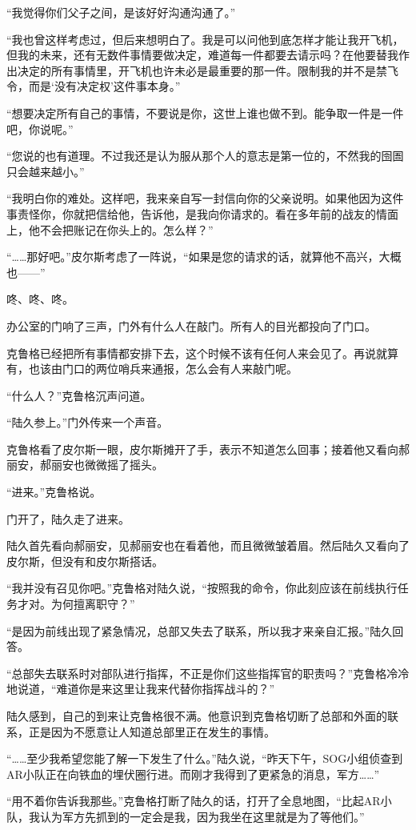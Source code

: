 “我觉得你们父子之间，是该好好沟通沟通了。”

“我也曾这样考虑过，但后来想明白了。我是可以问他到底怎样才能让我开飞机，但我的未来，还有无数件事情要做决定，难道每一件都要去请示吗？在他要替我作出决定的所有事情里，开飞机也许未必是最重要的那一件。限制我的并不是禁飞令，而是‘没有决定权’这件事本身。”

“想要决定所有自己的事情，不要说是你，这世上谁也做不到。能争取一件是一件吧，你说呢。”

“您说的也有道理。不过我还是认为服从那个人的意志是第一位的，不然我的囹圄只会越来越小。”

“我明白你的难处。这样吧，我来亲自写一封信向你的父亲说明。如果他因为这件事责怪你，你就把信给他，告诉他，是我向你请求的。看在多年前的战友的情面上，他不会把账记在你头上的。怎么样？”

“……那好吧。”皮尔斯考虑了一阵说，“如果是您的请求的话，就算他不高兴，大概也——”

咚、咚、咚。

办公室的门响了三声，门外有什么人在敲门。所有人的目光都投向了门口。

克鲁格已经把所有事情都安排下去，这个时候不该有任何人来会见了。再说就算有，也该由门口的两位哨兵来通报，怎么会有人来敲门呢。

“什么人？”克鲁格沉声问道。

“陆久参上。”门外传来一个声音。

克鲁格看了皮尔斯一眼，皮尔斯摊开了手，表示不知道怎么回事；接着他又看向郝丽安，郝丽安也微微摇了摇头。

“进来。”克鲁格说。

门开了，陆久走了进来。

陆久首先看向郝丽安，见郝丽安也在看着他，而且微微皱着眉。然后陆久又看向了皮尔斯，但没有和皮尔斯搭话。

“我并没有召见你吧。”克鲁格对陆久说，“按照我的命令，你此刻应该在前线执行任务才对。为何擅离职守？”

“是因为前线出现了紧急情况，总部又失去了联系，所以我才来亲自汇报。”陆久回答。

“总部失去联系时对部队进行指挥，不正是你们这些指挥官的职责吗？”克鲁格冷冷地说道，“难道你是来这里让我来代替你指挥战斗的？”

陆久感到，自己的到来让克鲁格很不满。他意识到克鲁格切断了总部和外面的联系，正是因为不愿意让人知道总部里正在发生的事情。

“……至少我希望您能了解一下发生了什么。”陆久说，“昨天下午，SOG小组侦查到AR小队正在向铁血的埋伏圈行进。而刚才我得到了更紧急的消息，军方……”

“用不着你告诉我那些。”克鲁格打断了陆久的话，打开了全息地图，“比起AR小队，我认为军方先抓到的一定会是我，因为我坐在这里就是为了等他们。”

